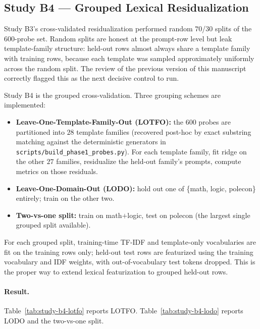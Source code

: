 \subsection{Study B4 — Grouped Lexical Residualization}
\label{sec:results-study-b4}

Study B3's cross-validated residualization performed random $70$/$30$
splits of the 600-probe set. Random splits are honest at the prompt-row
level but leak template-family structure: held-out rows almost always
share a template family with training rows, because each template was
sampled approximately uniformly across the random split. The review
of the previous version of this manuscript correctly flagged this as
the next decisive control to run.

Study B4 is the grouped cross-validation. Three grouping schemes are
implemented:

\begin{itemize}
    \item \textbf{Leave-One-Template-Family-Out (LOTFO):} the 600
        probes are partitioned into $28$ template families
        (recovered post-hoc by exact substring matching against the
        deterministic generators in
        \texttt{scripts/build\_phase1\_probes.py}). For each
        template family, fit ridge on the other $27$ families,
        residualize the held-out family's prompts, compute metrics
        on those residuals.
    \item \textbf{Leave-One-Domain-Out (LODO):} hold out one of
        \{math, logic, polecon\} entirely; train on the other two.
    \item \textbf{Two-vs-one split:} train on math$+$logic, test on
        polecon (the largest single grouped split available).
\end{itemize}

For each grouped split, training-time TF-IDF and template-only
vocabularies are fit on the training rows only; held-out test rows
are featurized using the training vocabulary and IDF weights, with
out-of-vocabulary test tokens dropped. This is the proper way to
extend lexical featurization to grouped held-out rows.

\paragraph{Result.} Table~\ref{tab:study-b4-lotfo} reports LOTFO.
Table~\ref{tab:study-b4-lodo} reports LODO and the two-vs-one split.

